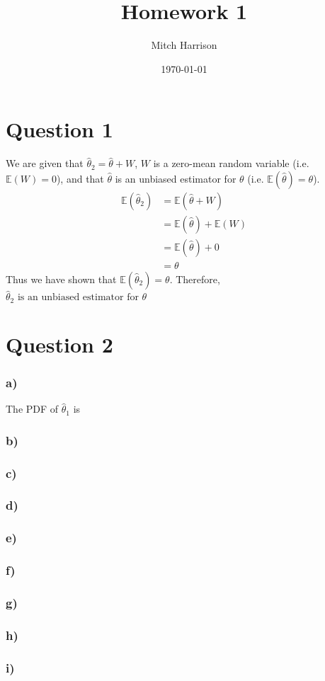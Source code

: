\documentclass[titlepage, 12pt, leqno]{article}
\title{\Huge{Homework 1}}
\author{\large{Mitch Harrison}}
\date{\today}
\begin{document}
\setlength{\parskip}{1\baselineskip}
\setlength{\parindent}{15pt}
\maketitle
\newpage


\section*{Question 1}
We are given that $\hat \theta_{2} = \hat \theta + W$, $W$ is a zero-mean
random variable (i.e. $\mathbb{E}(W) = 0$), and that $\hat \theta$ is an
unbiased estimator for $\theta$ (i.e. $\mathbb{E}(\hat \theta) = \theta$).
\begin{align*}
    \mathbb{E}(\hat \theta_{2}) &= \mathbb{E}(\hat \theta+W) \\
                                &= \mathbb{E}(\hat \theta)+\mathbb{E}(W) \\
                                &= \mathbb{E}(\hat \theta) + 0 \\
                                &= \theta
\end{align*}
Thus we have shown that $\mathbb{E}(\hat \theta_{2}) = \theta$. Therefore,
$\boxed{\hat \theta_{2} \text{ is an unbiased estimator for }\theta}$

\section*{Question 2}
\subsubsection{a)}
The PDF of $\hat \theta_{1}$ is

\subsubsection{b)}
\subsubsection{c)}
\subsubsection{d)}
\subsubsection{e)}
\subsubsection{f)}
\subsubsection{g)}
\subsubsection{h)}
\subsubsection{i)}
\end{document}
